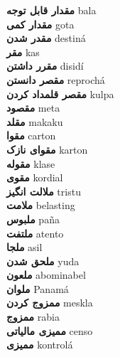 \textbf{ مقدار قابل توجه  } bala \\
\textbf{ مقدار کمی  } gota \\
\textbf{ مقدر شدن  } destiná \\
\textbf{ مقر  } kas \\
\textbf{ مقرر داشتن  } disidí \\
\textbf{ مقصر دانستن  } reprochá \\
\textbf{ مقصر قلمداد کردن  } kulpa \\
\textbf{ مقصود  } meta \\
\textbf{ مقلد  } makaku \\
\textbf{ مقوا  } carton \\
\textbf{ مقوای نازک  } karton \\
\textbf{ مقوله  } klase \\
\textbf{ مقوی  } kordial \\
\textbf{ ملالت انگیز  } tristu \\
\textbf{ ملامت  } belasting \\
\textbf{ ملبوس  } paña \\
\textbf{ ملتفت  } atento \\
\textbf{ ملجا  } asil \\
\textbf{ ملحق شدن  } yuda \\
\textbf{ ملعون  } abominabel \\
\textbf{ ملوان  } Panamá \\
\textbf{ ممزوج کردن  } meskla \\
\textbf{ ممزوج  } rabia \\
\textbf{ ممیزی مالیاتی  } censo \\
\textbf{ ممیزی  } kontrolá \\
